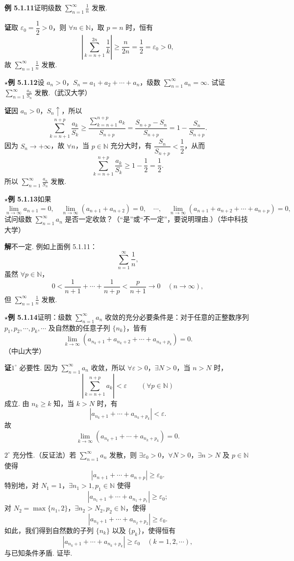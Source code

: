 \documentclass[UTF8,12pt,a4paper,fontset=fandol]{ctexart}
\begin{document}
\noindent\textbf{例 5.1.11}\quad 证明级数 $\displaystyle\sum_{n=1}^\infty\frac1n$ 发散.

\noindent\textbf{证}\quad 取 $\varepsilon_0=\dfrac12>0$，则 $\forall n\in\mathbb{N}$，取 $p=n$ 时，恒有
\[
  \left|\sum_{k=n+1}^{2n}\frac1k\right|
  \ge \frac n{2n}=\frac12=\varepsilon_0>0,
\]
故 $\displaystyle\sum_{n=1}^\infty\frac1n$ 发散.

\noindent\textbf{$\star$例 5.1.12}\quad 设 $a_n>0$，$S_n=a_1+a_2+\cdots+a_n$，级数 $\displaystyle\sum_{n=1}^\infty a_n=\infty$. 试证 $\displaystyle\sum_{n=1}^\infty\frac{a_n}{S_n}$ 发散.（武汉大学）

\noindent\textbf{证}\quad 因 $a_n>0$，$S_n\uparrow$，所以
\[
  \sum_{k=n+1}^{n+p}\frac{a_k}{S_k}
  \ge \frac{\sum_{k=n+1}^{n+p}a_k}{S_{n+p}}
  =\frac{S_{n+p}-S_n}{S_{n+p}}
  =1-\frac{S_n}{S_{n+p}}.
\]
因为 $S_n\to+\infty$，故 $\forall n$，当 $p\in\mathbb{N}$ 充分大时，有 $\dfrac{S_n}{S_{n+p}}<\dfrac12$，从而
\[
  \sum_{k=n+1}^{n+p}\frac{a_k}{S_k}\ge 1-\frac12=\frac12.
\]
所以 $\displaystyle\sum_{n=1}^\infty\frac{a_n}{S_n}$ 发散.

\noindent\textbf{$\star$例 5.1.13}\quad 如果
\[
  \lim_{n\to\infty}a_{n+1}=0,\quad
  \lim_{n\to\infty}(a_{n+1}+a_{n+2})=0,\quad\cdots,\quad
  \lim_{n\to\infty}(a_{n+1}+a_{n+2}+\cdots+a_{n+p})=0,
\]
试问级数 $\displaystyle\sum_{n=1}^\infty a_n$ 是否一定收敛？（“是”或“不一定”，要说明理由.）（华中科技大学）

\noindent\textbf{解}\quad 不一定. 例如上面例 5.1.11：
\[
  \sum_{n=1}^\infty\frac1n,
\]
虽然 $\forall p\in\mathbb{N}$，
\[
  0<\frac1{n+1}+\cdots+\frac1{n+p}<\frac p{n+1}\to0\quad(n\to\infty),
\]
但 $\displaystyle\sum_{n=1}^\infty\frac1n$ 发散.

\noindent\textbf{$\star$例 5.1.14}\quad 证明：级数 $\displaystyle\sum_{n=1}^\infty a_n$ 收敛的充分必要条件是：对于任意的正整数序列 $p_1,p_2,\cdots,p_k,\cdots$ 及自然数的任意子列 $\{n_k\}$，皆有
\[
  \lim_{k\to\infty}(a_{n_k+1}+a_{n_k+2}+\cdots+a_{n_k+p_k})=0.
\]
（中山大学）

\noindent\textbf{证}\quad $1^\circ$ 必要性. 因为 $\displaystyle\sum_{n=1}^\infty a_n$ 收敛，所以 $\forall\varepsilon>0$，$\exists N>0$，当 $n>N$ 时，
\[
  \left|\sum_{k=n+1}^{n+p}a_k\right|<\varepsilon\qquad(\forall p\in\mathbb{N})
\]
成立. 由 $n_k\ge k$ 知，当 $k>N$ 时，有
\[
  |a_{n_k+1}+\cdots+a_{n_k+p_k}|<\varepsilon.
\]
故
\[
  \lim_{k\to\infty}(a_{n_k+1}+\cdots+a_{n_k+p_k})=0.
\]

$2^\circ$ 充分性.（反证法）若 $\displaystyle\sum_{n=1}^\infty a_n$ 发散，则 $\exists\varepsilon_0>0$，$\forall N>0$，$\exists n>N$ 及 $p\in\mathbb{N}$ 使得
\[
  |a_{n+1}+\cdots+a_{n+p}|\ge\varepsilon_0.
\]
特别地，对 $N_1=1$，$\exists n_1>1,p_1\in\mathbb{N}$ 使得
\[
  |a_{n_1+1}+\cdots+a_{n_1+p_1}|\ge\varepsilon_0;
\]
对 $N_2=\max\{n_1,2\}$，$\exists n_2>N_2,p_2\in\mathbb{N}$，使得
\[
  |a_{n_2+1}+\cdots+a_{n_2+p_2}|\ge\varepsilon_0.
\]
如此，我们得到自然数的子列 $\{n_k\}$ 以及 $\{p_k\}$，使得恒有
\[
  |a_{n_k+1}+\cdots+a_{n_k+p_k}|\ge\varepsilon_0\quad(k=1,2,\cdots),
\]
与已知条件矛盾. 证毕.
\end{document}
